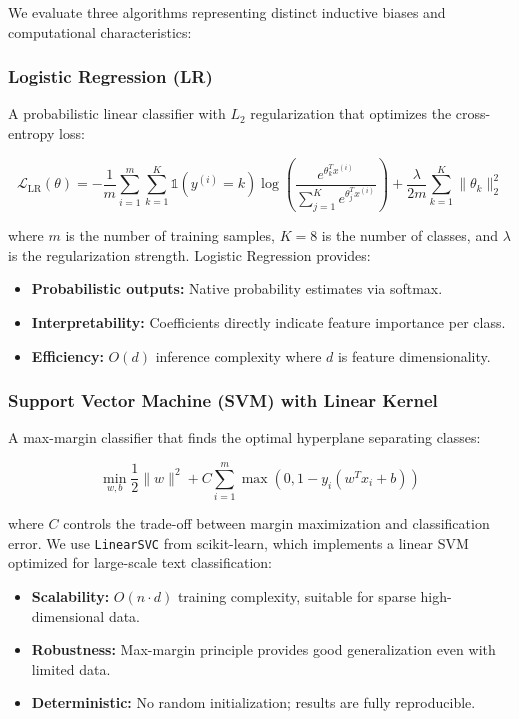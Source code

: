 \documentclass[12pt,a4paper]{article}
\begin{document}
We evaluate three algorithms representing distinct inductive biases and computational characteristics:

\subsubsection{Logistic Regression (LR)}
\label{subsubsec:logreg}

A probabilistic linear classifier with $L_2$ regularization that optimizes the cross-entropy loss:

\begin{equation}
    \mathcal{L}_{\text{LR}}(\theta) = -\frac{1}{m}\sum_{i=1}^{m}\sum_{k=1}^{K} \mathbb{1}(y^{(i)} = k) \log\left(\frac{e^{\theta_k^T x^{(i)}}}{\sum_{j=1}^{K} e^{\theta_j^T x^{(i)}}}\right) + \frac{\lambda}{2m}\sum_{k=1}^{K}\|\theta_k\|_2^2
\end{equation}

where $m$ is the number of training samples, $K=8$ is the number of classes, and $\lambda$ is the regularization strength. Logistic Regression provides:
\begin{itemize}[leftmargin=*]
    \item \textbf{Probabilistic outputs:} Native probability estimates via softmax.
    \item \textbf{Interpretability:} Coefficients directly indicate feature importance per class.
    \item \textbf{Efficiency:} $O(d)$ inference complexity where $d$ is feature dimensionality.
\end{itemize}

\subsubsection{Support Vector Machine (SVM) with Linear Kernel}
\label{subsubsec:svm}

A max-margin classifier that finds the optimal hyperplane separating classes:

\begin{equation}
    \min_{w,b} \frac{1}{2}\|w\|^2 + C \sum_{i=1}^{m} \max(0, 1 - y_i(w^T x_i + b))
\end{equation}

where $C$ controls the trade-off between margin maximization and classification error. We use \texttt{LinearSVC} from scikit-learn, which implements a linear SVM optimized for large-scale text classification:
\begin{itemize}[leftmargin=*]
    \item \textbf{Scalability:} $O(n \cdot d)$ training complexity, suitable for sparse high-dimensional data.
    \item \textbf{Robustness:} Max-margin principle provides good generalization even with limited data.
    \item \textbf{Deterministic:} No random initialization; results are fully reproducible.
\end{itemize}
\end{document}
